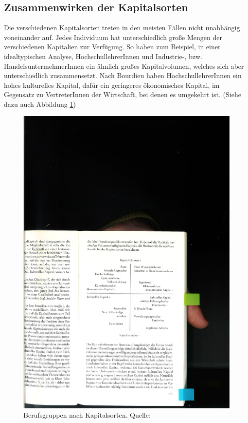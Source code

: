 \documentclass[a4paper, german, oneside]{scrbook}
\begin{document}
\subsection{Zusammenwirken der Kapitalsorten}
Die verschiedenen Kapitalsorten treten in den meisten Fällen nicht unabhängig voneinander auf. Jedes Individuum hat unterschiedlich große Mengen der verschiedenen Kapitalien zur Verfügung. So haben zum Beispiel, in einer idealtypischen Analyse, HochschullehrerInnen und Industrie-, bzw. HandelsuntermehmerInnen ein ähnlich großes Kapitalvolumen, welches sich aber unterschiedlich zusammensetzt. Nach Bourdieu haben HochschullehrerInnen ein hohes kulturelles Kapital, dafür ein geringeres ökonomisches Kapital, im Gegensatz zu VertreterInnen der Wirtschaft, bei denen es umgekehrt ist. (Siehe dazu auch Abbildung \ref{kapitalgrafik}) \parencite[vgl.][541]{joas_sozialtheorie:_2004}

\begin{figure}[htbp]
	\centering
  		\includegraphics{Kapitalien.pdf}
	\caption{Berufsgruppen nach Kapitalsorten. Quelle: \cite[541]{joas_sozialtheorie:_2004}\protect\footnotemark}
	\label{kapitalgrafik}
\end{figure}
\end{document}
